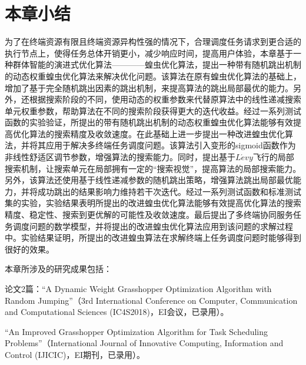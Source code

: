 \section{本章小结}\label{sec:task_scheduling_summary}

为了在终端资源有限且终端资源异构性强的情况下，合理调度任务请求到更合适的执行节点上，使得任务总体开销更小，减少响应时间，提高用户体验，本章基于一种群体智能的演进式优化算法————蝗虫优化算法，提出一种带有随机跳出机制的动态权重蝗虫优化算法来解决优化问题。该算法在原有蝗虫优化算法的基础上，增加了基于完全随机跳出因素的跳出机制，来提高算法的跳出局部最优的能力。另外，还根据搜索阶段的不同，使用动态的权重参数来代替原算法中的线性递减搜索单元权重参数，帮助算法在不同的搜索阶段获得更大的迭代收益。经过一系列测试函数的实验验证，所提出的带有随机跳出机制的动态权重蝗虫优化算法能够有效提高优化算法的搜索精度及收敛速度。在此基础上进一步提出一种改进蝗虫优化算法，并将其应用于解决多终端任务调度问题。该算法引入变形的sigmoid函数作为非线性舒适区调节参数，增强算法的搜索能力。同时，提出基于$L\acute{e}vy$飞行的局部搜索机制，让搜索单元在局部拥有一定的“搜索视觉”，提高算法的局部搜索能力。另外，该算法还使用基于线性递减参数的随机跳出策略，增强算法跳出局部最优能力，并将成功跳出的结果影响力维持若干次迭代。经过一系列测试函数和标准测试集的实验，实验结果表明所提出的改进蝗虫优化算法能够有效提高优化算法的搜索精度、稳定性、搜索到更优解的可能性及收敛速度。最后提出了多终端协同服务任务调度问题的数学模型，并将提出的改进蝗虫优化算法应用到该问题的求解过程中。实验结果证明，所提出的改进蝗虫算法在求解终端上任务调度问题时能够得到很好的效果。

本章所涉及的研究成果包括：

论文2篇：“A Dynamic Weight Grasshopper Optimization Algorithm with Random Jumping”（3rd International Conference on Computer, Communication and Computational Sciences (IC4S2018)，EI会议，已录用）。

“An Improved Grasshopper Optimization Algorithm for Task Scheduling Problems”（International Journal of Innovative Computing, Information and Control (IJICIC)，EI期刊，已录用）。
